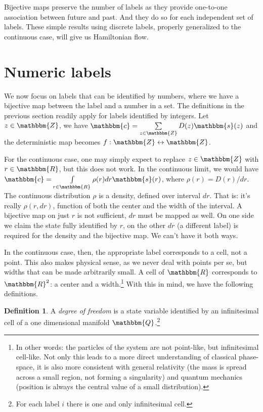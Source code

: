 \documentclass[aps,pra,10pt,twocolumn,floatfix,nofootinbib]{revtex4-1}
\theoremstyle{definition}
\newtheorem{defn}[thm]{Definition}
\begin{document}
Bijective maps preserve the number of labels as they provide one-to-one association between future and past. And they do so for each independent set of labels. These simple results using discrete labels, properly generalized to the continuous case, will give us Hamiltonian flow.

\section{Numeric labels}

We now focus on labels that can be identified by numbers, where we have a bijective map between the label and a number in a set. The definitions in the previous section readily apply for labels identified by integers. Let $z \in \mathbbm{Z}$, we have $\mathbbm{c}=\sum\limits_{z \in \mathbbm{Z}} D(z) \mathbbm{s}(z)$ and the deterministic map becomes $f:\mathbbm{Z} \leftrightarrow \mathbbm{Z}$.

For the continuous case, one may simply expect to replace $z \in \mathbbm{Z}$ with $r \in \mathbbm{R}$, but this does not work. In the continuous limit, we would have $\mathbbm{c}=\int\limits_{r \in \mathbbm{R}} \rho(r) dr \mathbbm{s}(r)$, where $\rho(r) = D(r) / dr$. The continuous distribution $\rho$ is a density, defined over interval $dr$. That is: it's really $\rho(r, dr)$, function of both the center and the width of the interval. A bijective map on just $r$ is not sufficient, $dr$ must be mapped as well. On one side we claim the state fully identified by $r$, on the other $dr$ (a different label) is required for the density and the bijective map. We can't have it both ways.

In the continuous case, then, the appropriate label corresponds to a cell, not a point. This also makes physical sense, as we never deal with points per se, but widths that can be made arbitrarily small. A cell of $\mathbbm{R}$ corresponds to $\mathbbm{R}^2$: a center and a width.\footnote{In other words: the particles of the system are not point-like, but infinitesimal cell-like. Not only this leads to a more direct understanding of classical phase-space, it is also more consistent with general relativity (the mass is spread across a small region, not forming a singularity) and quantum mechanics (position is always the central value of a small distribution).} With this in mind, we have the following definitions.

\begin{defn}\label{sdof}
A \emph{degree of freedom} is a state variable identified by an infinitesimal cell of a one dimensional manifold $\mathbbm{Q}$.\footnote{For each label $i$ there is one and only infinitesimal cell.}
\end{defn}
\end{document}
